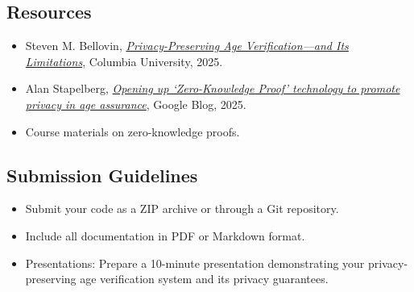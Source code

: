 \documentclass[10pt,a4paper,american]{exam}
\begin{document}
\subsection*{Resources}
\begin{itemize}
	\item Steven M. Bellovin, \href{https://appliedcryptography.page/paper/#age-verify}{\emph{Privacy-Preserving Age Verification—and Its Limitations}}, Columbia University, 2025.
	\item Alan Stapelberg, \href{https://blog.google/technology/safety-security/opening-up-zero-knowledge-proof-technology-to-promote-privacy-in-age-assurance/}{\emph{Opening up `Zero-Knowledge Proof' technology to promote privacy in age assurance}}, Google Blog, 2025.
	\item Course materials on zero-knowledge proofs.
\end{itemize}

\subsection*{Submission Guidelines}
\begin{itemize}
	\item Submit your code as a ZIP archive or through a Git repository.
	\item Include all documentation in PDF or Markdown format.
	\item Presentations: Prepare a 10-minute presentation demonstrating your privacy-preserving age verification system and its privacy guarantees.
\end{itemize}
\end{document}
